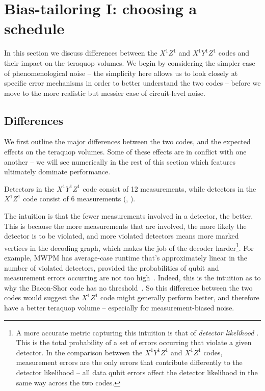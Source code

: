 \section{Bias-tailoring I: choosing a schedule}\label{sec:choosing-a-schedule}

In this section we discuss differences between the $X^1Z^1$ and $X^1Y^1Z^1$ codes and their impact on the teraquop volumes.
We begin by considering the simpler case of phenomenological noise -- the simplicity here allows us to look closely at specific error mechanisms in order to better understand the two codes -- before we move to the more realistic but messier case of circuit-level noise.

\subsection{Differences}\label{subsec:differences}

We first outline the major differences between the two codes, and the expected effects on the teraquop volumes.
Some of these effects are in conflict with one another -- we will see numerically in the rest of this section which features ultimately dominate performance.

\begin{difference}\label{dif:XYZ_XZ_meas_per_detector}
Detectors in the $X^1 Y^1 Z^1$ code consist of 12 measurements, while detectors in the $X^1 Z^1$ code consist of 6 measurements (, ).
\end{difference}

The intuition is that the fewer measurements involved in a detector, the better.
This is because the more measurements that are involved, the more likely the detector is to be violated,
and more violated detectors means more marked vertices in the decoding graph,
which makes the job of the decoder harder\footnote{A more accurate metric capturing this intuition is that of \textit{detector likelihood} \cite{hesner2024using}. This is the total probability of a set of errors occurring that violate a given detector. In the comparison between the $X^1 Y^1 Z^1$ and $X^1 Z^1$ codes, measurement errors are the only errors that contribute differently to the detector likelihood -- all data qubit errors affect the detector likelihood in the same way across the two codes.}.
For example, MWPM has average-case runtime that's
approximately linear in the number of violated detectors,
provided the probabilities of qubit and measurement errors occurring are not too high~\cite{higgott2025sparse}.
Indeed, this is the intuition as to why the Bacon-Shor code has no threshold~\cite{gidney2023baconthreshold}.
So this difference between the two codes would suggest the $X^1 Z^1$ code might generally perform better, and therefore have a better teraquop volume -- especially for measurement-biased noise.

